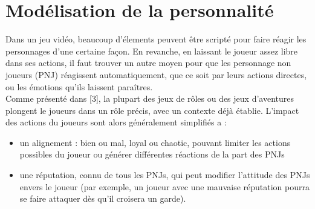 \documentclass[asi]{picINSA}
\begin{document}
\section{Modélisation de la personnalité}

Dans un jeu vidéo, beaucoup d'élements peuvent être scripté pour faire réagir les personnages d'une certaine façon. En revanche, en laissant le joueur assez libre dans ses actions, il faut trouver un autre moyen pour que les personnage non joueurs (PNJ) réagissent automatiquement, que ce soit par leurs actions directes, ou les émotions qu'ils laissent paraîtres.\\

Comme présenté dans [3], la plupart des jeux de rôles ou des jeux d'aventures plongent le joueurs dans un rôle précis, avec un contexte déjà établie. L'impact des actions du joueurs sont alors généralement simplifiés a :

\begin{itemize}
\item un alignement : bien ou mal, loyal ou chaotic, pouvant limiter
  les actions possibles du joueur ou générer différentes réactions de
  la part des PNJs

\item une réputation, connu de tous les PNJs, qui peut modifier
  l'attitude des PNJs envers le joueur (par exemple, un joueur avec
  une mauvaise réputation pourra se faire attaquer dès qu'il croisera
  un garde).
\end{itemize}

  
\end{document}
